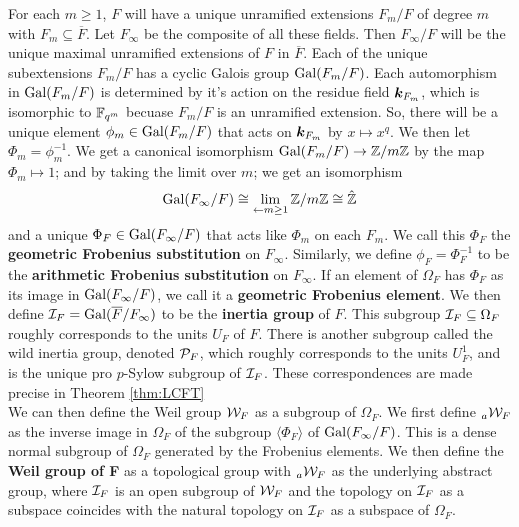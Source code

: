 For each $m \geq 1$, $F$ will have a unique unramified extensions $F_m/F$ of degree $m$ with $F_m \subseteq \overline{F}$.
Let $F_\infty$ be the composite of all these fields.
Then $F_\infty/F$ will be the unique maximal unramified extensions of $F$ in $\overline{F}$.
Each of the unique subextensions $F_m/F$ has a cyclic Galois group $\textrm{Gal}(F_m/F)$.
Each automorphism in $\textrm{Gal}(F_m/F)$ is determined by it's action on the residue field $\bm{k}_{F_m}$, which is isomorphic to $\mathbb{F}_{q^m}$ becuase $F_m/F$ is an unramified extension.
So, there will be a unique element $\phi_m \in \textrm{Gal}(F_m/F)$ that acts on $\bm{k}_{F_m}$ by $x \mapsto x^q$.
We then let $\Phi_m = \phi_m^{-1}$.
We get a canonical isomorphism $\textrm{Gal}(F_m/F) \to \mathbb{Z}/m\mathbb{Z}$ by the map $\Phi_m \mapsto 1$; and by taking the limit over $m$; we get an isomorphism
\[\textrm{Gal}(F_\infty/F) \cong \lim_{\leftarrow m \geq 1} \mathbb{Z}/m\mathbb{Z} \cong \hat{\mathbb{Z}}\]
and a unique $\Phi_F \in \textrm{Gal}(F_\infty/F)$ that acts like $\Phi_m$ on each $F_m$.
We call this $\Phi_F$ the \textbf{geometric Frobenius substitution} on $F_\infty$.
Similarly, we define $\phi_F = \Phi_F^{-1}$ to be the \textbf{arithmetic Frobenius substitution} on $F_\infty$.
If an element of $\Omega_F$ has $\Phi_F$ as its image in $\textrm{Gal}(F_\infty/F)$, we call it a \textbf{geometric Frobenius element}.
We then define $\mathcal{I}_F = \textrm{Gal}(\overline{F}/F_\infty)$ to be the \textbf{inertia group} of $F$.
This subgroup $\mathcal{I}_F \subseteq \Omega_F$ roughly corresponds to the units $U_F$ of $F$.
There is another subgroup called the wild inertia group, denoted $\mathcal{P}_F$, which roughly corresponds to the units $U_F^1$, and is the unique pro $p$-Sylow subgroup of $\mathcal{I}_F$.
These correspondences are made precise in Theorem \ref{thm:LCFT}
\\

We can then define the Weil group $\mathcal{W}_F$ as a subgroup of $\Omega_F$.
We first define $_a\mathcal{W}_F$ as the inverse image in $\Omega_F$ of the subgroup $\langle \Phi_F\rangle$ of $\textrm{Gal}(F_\infty/F)$.
This is a dense normal subgroup of $\Omega_F$ generated by the Frobenius elements.
We then define the \textbf{Weil group of F} as a topological group with $_a\mathcal{W}_F$ as the underlying abstract group, where $\mathcal{I}_F$ is an open subgroup of $\mathcal{W}_F$ and the topology on $\mathcal{I}_F$ as a subspace coincides with the natural topology on $\mathcal{I}_F$ as a subspace of $\Omega_F$.
\\

